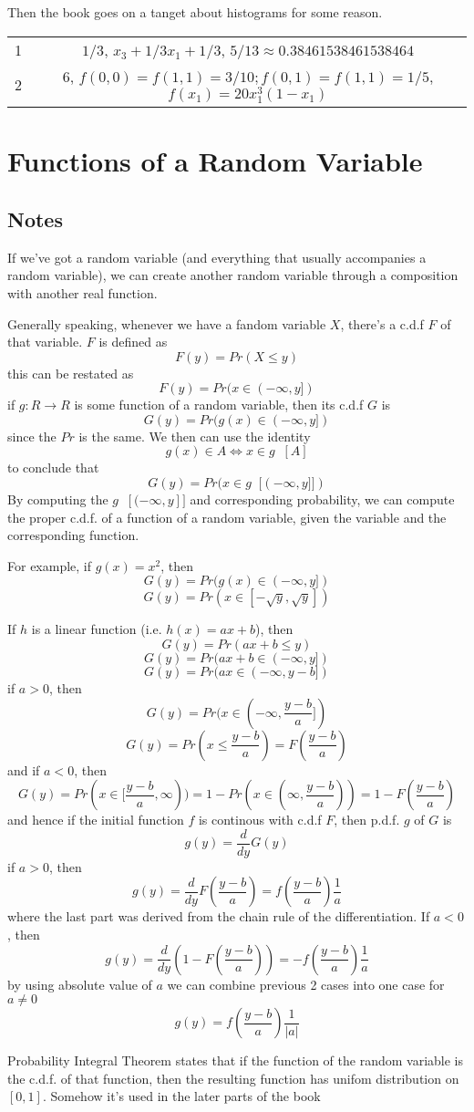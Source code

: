 \documentclass[11pt,oneside,titlepage]{book}
\DeclareMathOperator \inv {^{-1}}
\begin{document}
Then the book goes on a tanget about histograms for some reason.



\begin{tabular}[center]{||c | c|| }
  \hline
  1 & $1/3$,  $x_3 + 1/3 x_1 + 1/3$, $5/13 \approx 0.38461538461538464$\\
  2 & $6$, $f(0, 0) = f(1, 1) = 3/10; f(0, 1) = f(1, 1) = 1/5$, $f(x_1) = 20 x_1^3 (1 - x_1)$\\
  \hline 
\end{tabular}


\section{Functions of a Random Variable}

\subsection*{Notes}

If we've got a random variable (and everything that usually
accompanies a random variable), we can create another random variable
through a composition with another real function.

Generally speaking, whenever we have a fandom variable $X$, there's a
c.d.f $F$ of that variable. $F$ is defined as
$$F(y) = Pr(X \leq y)$$
this can be restated as
$$F(y) = Pr(x \in (-\infty, y])$$
if $g: R \to R$ is some function of a random variable, then its
c.d.f $G$ is
$$G(y) = Pr(g(x) \in (-\infty, y])$$
since the $Pr$ is the same. We then can use the identity
$$g(x) \in A \iff x \in g\inv[A]$$
to conclude that
$$G(y) = Pr(x \in g\inv[(-\infty, y]])$$
By computing the $g\inv[(-\infty, y]]$ and corresponding probability,
we can compute the proper c.d.f. of a function of a random variable,
given the variable and the corresponding function.

For example, if $g(x) = x^2$, then
$$G(y) = Pr(g(x) \in (-\infty, y])$$
$$G(y) = Pr(x \in [-\sqrt{y}, \sqrt{y}])$$

If $h$ is a linear function (i.e. $h(x) = ax + b$), then
$$G(y) = Pr(ax + b \leq y)$$
$$G(y) = Pr(ax + b \in (-\infty, y])$$
$$G(y) = Pr(ax \in (-\infty, y - b])$$
if $a > 0$, then 
$$G(y) = Pr(x \in (-\infty, \frac{y - b}{a}])$$
$$G(y) = Pr(x \leq \frac{y - b}{a}) = F(\frac{y - b}{a})$$
and if $a < 0$, then
$$G(y) = Pr(x \in [\frac{y - b}{a}, \infty)) =
1 - Pr(x \in (\infty, \frac{y - b}{a})) = 1 - F(\frac{y - b}{a})$$
and hence if the initial function $f$ is continous with c.d.f $F$,
then p.d.f. $g$ of $G$ is
$$g(y) = \frac{d}{dy}G(y)$$
if $a > 0$, then
$$g(y)= \frac{d}{dy}F(\frac{y - b}{a}) = f(\frac{y - b}{a}) \frac{1}{a}$$
where the last part was derived from the chain rule of the differentiation. 
If $a < 0$, then
$$g(y)= \frac{d}{dy}(1 - F(\frac{y - b}{a})) = -f(\frac{y - b}{a}) \frac{1}{a}$$
by using absolute value of $a$ we can combine previous 2 cases into
one case for $a \neq 0$
$$g(y) = f(\frac{y - b}{a}) \frac{1}{|a|}$$

Probability Integral Theorem states that if the function of the random
variable is the c.d.f. of that function, then the resulting function
has unifom distribution on $[0, 1]$. Somehow it's used in the later
parts of the book
\end{document}
